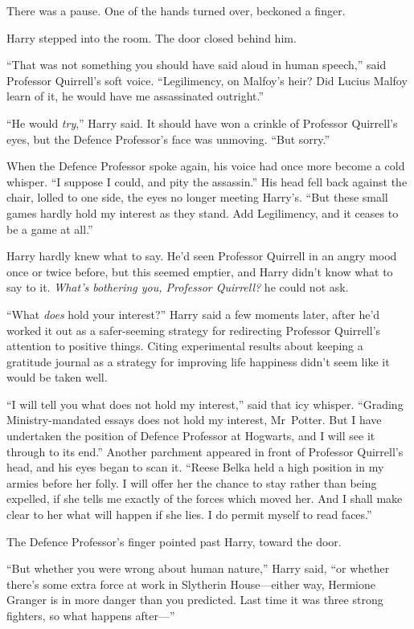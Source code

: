 There was a pause. One of the hands turned over, beckoned a finger.

Harry stepped into the room. The door closed behind him.

“That was not something you should have said aloud in human speech,” said Professor Quirrell’s soft voice. “Legilimency, on Malfoy’s heir? Did Lucius Malfoy learn of it, he would have me assassinated outright.”

“He would \emph{try},” Harry said. It should have won a crinkle of Professor Quirrell’s eyes, but the Defence Professor’s face was unmoving. “But sorry.”

When the Defence Professor spoke again, his voice had once more become a cold whisper. “I suppose I could, and pity the assassin.” His head fell back against the chair, lolled to one side, the eyes no longer meeting Harry’s. “But these small games hardly hold my interest as they stand. Add Legilimency, and it ceases to be a game at all.”

Harry hardly knew what to say. He’d seen Professor Quirrell in an angry mood once or twice before, but this seemed emptier, and Harry didn’t know what to say to it. \emph{What’s bothering you, Professor Quirrell?} he could not ask.

“What \emph{does} hold your interest?” Harry said a few moments later, after he’d worked it out as a safer-seeming strategy for redirecting Professor Quirrell’s attention to positive things. Citing experimental results about keeping a gratitude journal as a strategy for improving life happiness didn’t seem like it would be taken well.

“I will tell you what does not hold my interest,” said that icy whisper. “Grading Ministry-mandated essays does not hold my interest, Mr~Potter. But I have undertaken the position of Defence Professor at Hogwarts, and I will see it through to its end.” Another parchment appeared in front of Professor Quirrell’s head, and his eyes began to scan it. “Reese Belka held a high position in my armies before her folly. I will offer her the chance to stay rather than being expelled, if she tells me exactly of the forces which moved her. And I shall make clear to her what will happen if she lies. I do permit myself to read faces.”

The Defence Professor’s finger pointed past Harry, toward the door.

“But whether you were wrong about human nature,” Harry said, “or whether there’s some extra force at work in Slytherin House—either way, Hermione Granger is in more danger than you predicted. Last time it was three strong fighters, so what happens after—”

